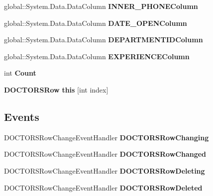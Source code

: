 \begin{CompactItemize}
\item 
global::System.Data.DataColumn \textbf{INNER\_\-PHONEColumn}\hspace{0.3cm}{\tt  [get]}\label{class_automatic_medical_system_1_1_data_set1_1_1_d_o_c_t_o_r_s_data_table_a3ce05f33dec2cf908fcc7c2b46b59ea}

\item 
global::System.Data.DataColumn \textbf{DATE\_\-OPENColumn}\hspace{0.3cm}{\tt  [get]}\label{class_automatic_medical_system_1_1_data_set1_1_1_d_o_c_t_o_r_s_data_table_65f62adecbf175b8c7dc77167197624d}

\item 
global::System.Data.DataColumn \textbf{DEPARTMENTIDColumn}\hspace{0.3cm}{\tt  [get]}\label{class_automatic_medical_system_1_1_data_set1_1_1_d_o_c_t_o_r_s_data_table_4a28a5493f67d1d950b4a16666ebe927}

\item 
global::System.Data.DataColumn \textbf{EXPERIENCEColumn}\hspace{0.3cm}{\tt  [get]}\label{class_automatic_medical_system_1_1_data_set1_1_1_d_o_c_t_o_r_s_data_table_058809d8906d2e94fa8baff011abfd55}

\item 
int \textbf{Count}\hspace{0.3cm}{\tt  [get]}\label{class_automatic_medical_system_1_1_data_set1_1_1_d_o_c_t_o_r_s_data_table_1d165892157786dd835099488b3c429e}

\item 
{\bf DOCTORSRow} \textbf{this} [int index]\hspace{0.3cm}{\tt  [get]}\label{class_automatic_medical_system_1_1_data_set1_1_1_d_o_c_t_o_r_s_data_table_80e55ce7cb92b6e435448cc273f0ce90}

\end{CompactItemize}
\subsection*{Events}
\begin{CompactItemize}
\item 
DOCTORSRowChangeEventHandler \textbf{DOCTORSRowChanging}\label{class_automatic_medical_system_1_1_data_set1_1_1_d_o_c_t_o_r_s_data_table_3504b75dd683ebbb708493daabe80e76}

\item 
DOCTORSRowChangeEventHandler \textbf{DOCTORSRowChanged}\label{class_automatic_medical_system_1_1_data_set1_1_1_d_o_c_t_o_r_s_data_table_aeee2d680e09dff5bad664ef284dd997}

\item 
DOCTORSRowChangeEventHandler \textbf{DOCTORSRowDeleting}\label{class_automatic_medical_system_1_1_data_set1_1_1_d_o_c_t_o_r_s_data_table_ef77ac37e03543b40c1aa71f62cbc708}

\item 
DOCTORSRowChangeEventHandler \textbf{DOCTORSRowDeleted}\label{class_automatic_medical_system_1_1_data_set1_1_1_d_o_c_t_o_r_s_data_table_c6d8176e3edfb3923683ec57de459fdb}

\end{CompactItemize}


